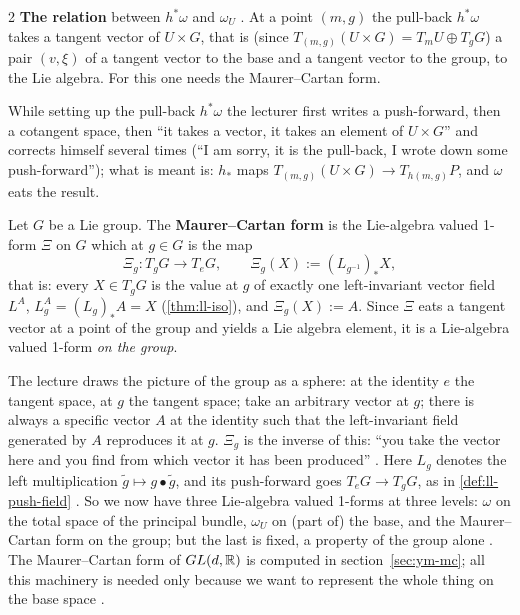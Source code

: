 \begin{paracol}{2}
\textbf{The relation} between $h^*\omega$ and $\omega_U$ . At a point $(m,g)$ the pull-back $h^*\omega$ takes a tangent vector of $U\times G$, that is (since $T_{(m,g)}(U\times G)=T_mU\oplus T_gG$) a pair $(v,\xi)$ of a tangent vector to the base and a tangent vector to the group, to the Lie algebra. For this one needs the Maurer--Cartan form.
\begin{coursenote}
While setting up the pull-back $h^*\omega$ the lecturer first writes a push-forward, then a cotangent space, then ``it takes a vector, it takes an element of $U\times G$'' and corrects himself several times (``I am sorry, it is the pull-back, I wrote down some push-forward''); what is meant is: $h_*$ maps $T_{(m,g)}(U\times G)\to T_{h(m,g)}P$, and $\omega$ eats the result. 
\end{coursenote}
   
\begin{definition}\label{def:ym-mc}
Let $G$ be a Lie group. The \textbf{Maurer--Cartan form} is the Lie-algebra valued 1-form $\Xi$ on $G$ which at $g\in G$ is the map
\[
  \Xi_g\colon T_gG\to T_eG,\qquad\Xi_g(X):=(L_{g^{-1}})_*X ,
\]
that is: every $X\in T_gG$ is the value at $g$ of exactly one left-invariant vector field $L^A$, $L^A_g=(L_g)_*A=X$ (\cref{thm:ll-iso}), and $\Xi_g(X):=A$. Since $\Xi$ eats a tangent vector at a point of the group and yields a Lie algebra element, it is a Lie-algebra valued 1-form \emph{on the group}.       
\end{definition}
The lecture draws the picture of the group as a sphere: at the identity $e$ the tangent space, at $g$ the tangent space; take an arbitrary vector at $g$; there is always a specific vector $A$ at the identity such that the left-invariant field generated by $A$ reproduces it at $g$. $\Xi_g$ is the inverse of this: ``you take the vector here and you find from which vector it has been produced''     . Here $L_g$ denotes the left multiplication $\tilde g\mapsto g\bullet\tilde g$, and its push-forward goes $T_eG\to T_gG$, as in \cref{def:ll-push-field}   . So we now have three Lie-algebra valued 1-forms at three levels: $\omega$ on the total space of the principal bundle, $\omega_U$ on (part of) the base, and the Maurer--Cartan form on the group; but the last is fixed, a property of the group alone   . The Maurer--Cartan form of $GL(d,\mathbb{R})$ is computed in section~\ref{sec:ym-mc}; all this machinery is needed only because we want to represent the whole thing on the base space .

\end{paracol}
